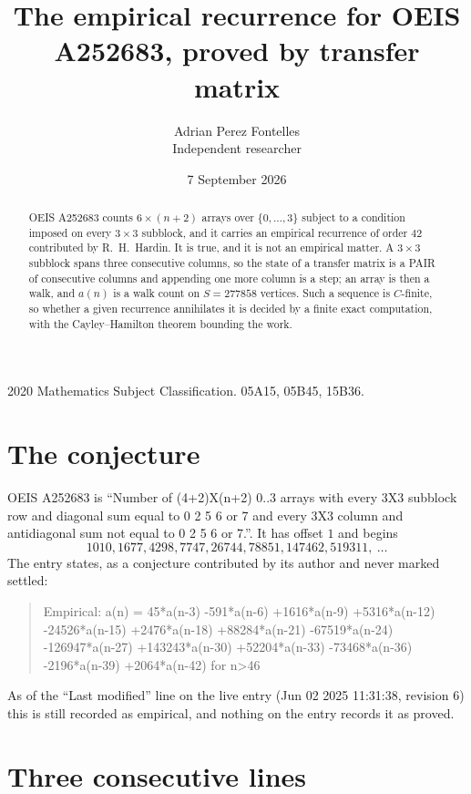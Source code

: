 \documentclass[11pt,a4paper]{article}
\title{The empirical recurrence for OEIS A252683, proved by transfer matrix}
\author{Adrian Perez Fontelles\\ \small Independent researcher}
\date{7 September 2026}
\theoremstyle{plain}
\theoremstyle{definition}
\begin{document}
\maketitle

\begin{abstract}
OEIS A252683 counts $6\times(n+2)$ arrays over $\{0,\dots,3\}$ subject to a condition imposed on
every $3\times3$ subblock, and it carries an empirical recurrence of order $42$
contributed by R.~H.~Hardin. It is true, and it is not an empirical matter. A $3\times3$
subblock spans three consecutive columns, so the state of a transfer matrix is a PAIR of
consecutive columns and appending one more column is a step; an array is then a walk, and
$a(n)$ is a walk count on $S=277858$ vertices. Such a sequence is $C$-finite, so whether a given
recurrence annihilates it is decided by a finite exact computation, with the Cayley--Hamilton
theorem bounding the work.
\end{abstract}

\noindent\small 2020 Mathematics Subject Classification. 05A15, 05B45, 15B36.\normalsize

\section{The conjecture}

OEIS A252683 is ``Number of (4+2)X(n+2) 0..3 arrays with every 3X3 subblock row and diagonal sum equal to 0 2 5 6 or 7 and every 3X3 column and antidiagonal sum not equal to 0 2 5 6 or 7.''. It has offset $1$ and begins
\[
1010, 1677, 4298, 7747, 26744, 78851, 147462, 519311,\ \dots
\]
The entry states, as a conjecture contributed by its author and never marked settled:
\begin{quote}
Empirical: a(n) = 45*a(n-3) -591*a(n-6) +1616*a(n-9) +5316*a(n-12) -24526*a(n-15) +2476*a(n-18) +88284*a(n-21) -67519*a(n-24) -126947*a(n-27) +143243*a(n-30) +52204*a(n-33) -73468*a(n-36) -2196*a(n-39) +2064*a(n-42) for n>46
\end{quote}
As of the ``Last modified'' line on the live entry (Jun 02 2025 11:31:38, revision 6) this is still
recorded as empirical, and nothing on the entry records it as proved.

\section{Three consecutive lines}
\end{document}
